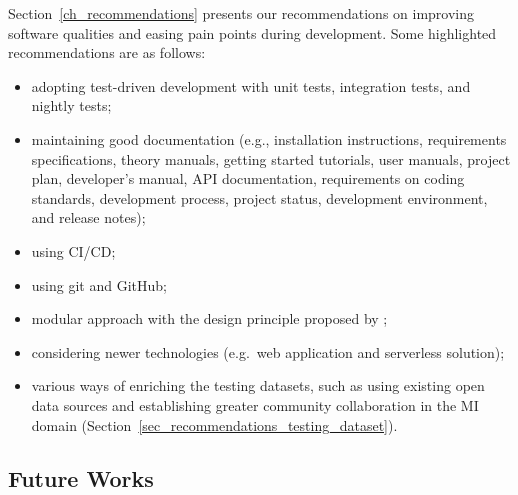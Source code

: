 \documentclass[final, 3p, times, authoryear]{elsarticle}
\begin{document}
Section~\ref{ch_recommendations} presents our recommendations on improving
software qualities and easing pain points during development. Some highlighted
recommendations are as follows:
\begin{itemize}
\item adopting test-driven development with unit tests, integration tests, and
nightly tests;
\item maintaining good documentation (e.g., installation instructions,
requirements specifications, theory manuals, getting started tutorials, user
manuals, project plan, developer’s manual, API documentation, requirements on
coding standards, development process, project status, development environment,
and release notes);
\item using CI/CD;
\item using git and GitHub;
\item modular approach with the design principle proposed by \citet{ParnasEtAl2000};
\item considering newer technologies (e.g.\ web application and serverless
solution);
\item various ways of enriching the testing datasets, such as using existing
open data sources and establishing greater community collaboration in the MI
domain (Section~\ref{sec_recommendations_testing_dataset}).
\end{itemize}

\subsection{Future Works}
\end{document}
